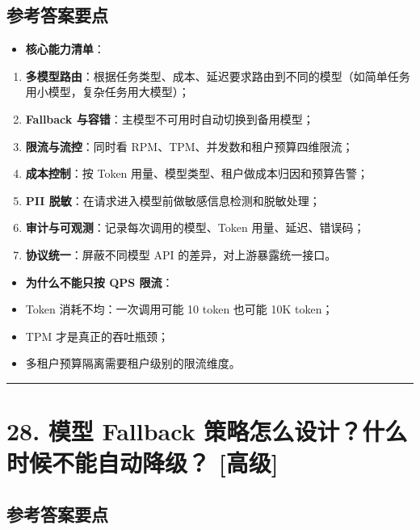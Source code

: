 \documentclass[9pt,a4paper,twocolumn]{ctexart}
\newcommand{\lvgao}{\usebox{\badgegaobox}}
\def\lvgao{[高级]}%
\begin{document}
\subsection*{参考答案要点}

\begin{itemize}[itemsep=1pt, topsep=2pt]
  \item \textbf{核心能力清单}：
\end{itemize}
\begin{enumerate}[itemsep=1pt, topsep=2pt]
  \item \textbf{多模型路由}：根据任务类型、成本、延迟要求路由到不同的模型（如简单任务用小模型，复杂任务用大模型）；
  \item \textbf{Fallback 与容错}：主模型不可用时自动切换到备用模型；
  \item \textbf{限流与流控}：同时看 RPM、TPM、并发数和租户预算四维限流；
  \item \textbf{成本控制}：按 Token 用量、模型类型、租户做成本归因和预算告警；
  \item \textbf{PII 脱敏}：在请求进入模型前做敏感信息检测和脱敏处理；
  \item \textbf{审计与可观测}：记录每次调用的模型、Token 用量、延迟、错误码；
  \item \textbf{协议统一}：屏蔽不同模型 API 的差异，对上游暴露统一接口。
\end{enumerate}
\begin{itemize}[itemsep=1pt, topsep=2pt]
  \item \textbf{为什么不能只按 QPS 限流}：
  \item Token 消耗不均：一次调用可能 10 token 也可能 10K token；
  \item TPM 才是真正的吞吐瓶颈；
  \item 多租户预算隔离需要租户级别的限流维度。
\end{itemize}


\vspace{2pt}
\noindent\rule{\columnwidth}{0.3pt}\vspace{2pt}



\section*{28. 模型 Fallback 策略怎么设计？什么时候不能自动降级？ \lvgao{}}


\subsection*{参考答案要点}
\end{document}
